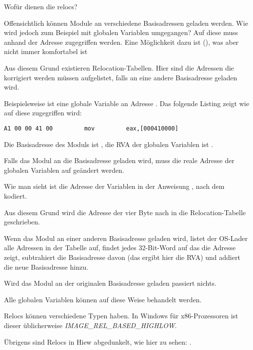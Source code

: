 Wofür dienen die relocs?

Offensichtlich können Module an verschiedene Basisadressen geladen werden. Wie
wird jedoch zum Beispiel mit globalen Variablen umgegangen?
Auf diese muss anhand der Adresse zugegriffen werden. Eine Möglichkeit dazu ist
\PICcode{} (), was aber nicht immer komfortabel ist

Aus diesem Grund existieren Relocation-Tabellen. Hier sind die Adressen die korrigiert
werden müssen aufgelistet, falls an eine andere Basisadresse geladen wird.

Beispielsweise ist eine globale Variable an Adresse . Das folgende
Listing zeigt wie auf diese zugegriffen wird:

\begin{lstlisting}
A1 00 00 41 00         mov         eax,[000410000]
\end{lstlisting}

Die Basisadresse des Moduls ist , die \ac{RVA} der globalen Variablen
ist .

Falls das Modul an die Basisadresse  geladen wird, muss die reale
Adresse der globalen Variablen auf  geändert werden.


Wie man sieht ist die Adresse der Variablen in der Anweisung , nach dem
 kodiert.

Aus diesem Grund wird die Adresse der vier Byte nach  in die
Relocation-Tabelle geschrieben.

Wenn das Modul an einer anderen Basisadresse geladen wird, listet der \ac{OS}-Lader
alle Adressen in der Tabelle auf, findet jedes 32-Bit-Word auf das die Adresse zeigt,
subtrahiert die Basisadresse davon (das ergibt hier die \ac{RVA}) und addiert die
neue Basisadresse hinzu.

Wird das Modul an der originalen Basisadresse geladen passiert nichts.

Alle globalen Variablen können auf diese Weise behandelt werden.

Relocs können verschiedene Typen haben. In Windows für x86-Prozessoren ist dieser
üblicherweise \emph{IMAGE\_REL\_BASED\_HIGHLOW}.

Übrigens sind Relocs in Hiew abgedunkelt, wie hier zu sehen: .

